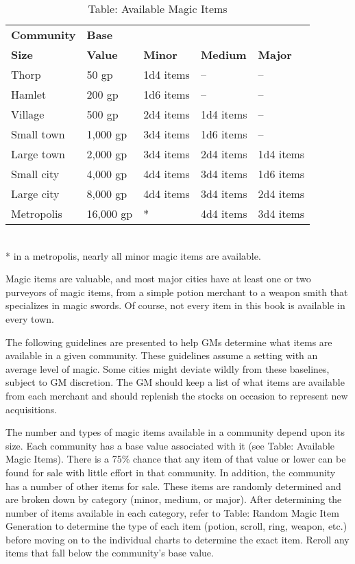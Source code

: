 \begin{table}[]
\sffamily
\caption{Table: Available Magic Items}
\setlength{\tabcolsep}{1pt}
\begin{tabular}{lllll}
\textbf{Community} & \textbf{Base}  \\
\textbf{Size}      & \textbf{Value} & \textbf{Minor} & \textbf{Medium} & \textbf{Major}\\
Thorp & 50 gp & 1d4 items & -- & -- \\
 Hamlet & 200 gp & 1d6 items & -- & -- \\
 Village & 500 gp & 2d4 items & 1d4 items & -- \\
 Small town & 1,000 gp & 3d4 items & 1d6 items & -- \\
 Large town & 2,000 gp & 3d4 items & 2d4 items & 1d4 items \\
 Small city & 4,000 gp & 4d4 items & 3d4 items & 1d6 items \\
 Large city & 8,000 gp & 4d4 items & 3d4 items & 2d4 items \\
 Metropolis & 16,000 gp & * & 4d4 items & 3d4 items\\
\end{tabular}\\
* in a metropolis, nearly all minor magic items are available.\\
\end{table}

				
Magic items are valuable, and most major cities have at least one or two purveyors of magic items, from a simple potion merchant to a weapon smith that specializes in magic swords. Of course, not every item in this book is available in every town. 
				
The following guidelines are presented to help GMs determine what items are available in a given community. These guidelines assume a setting with an average level of magic. Some cities might deviate wildly from these baselines, subject to GM discretion. The GM should keep a list of what items are available from each merchant and should replenish the stocks on occasion to represent new acquisitions.
				
The number and types of magic items available in a community depend upon its size. Each community has a base value associated with it (see Table: Available Magic Items). There is a 75\% chance that any item of that value or lower can be found for sale with little effort in that community. In addition, the community has a number of other items for sale. These items are randomly determined and are broken down by category (minor, medium, or major). After determining the number of items available in each category, refer to Table: Random Magic Item Generation to determine the type of each item (potion, scroll, ring, weapon, etc.) before moving on to the individual charts to determine the exact item. Reroll any items that fall below the community's base value.
				
